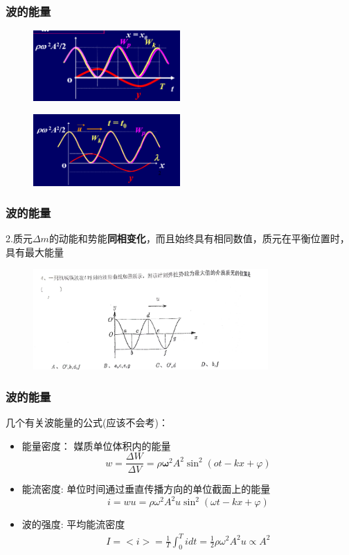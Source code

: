 \documentclass[UTF8]{ctexbeamer}
\begin{document}
\begin{frame}
\frametitle{波的能量}
\begin{figure}[!ht]
	\centering
	\includegraphics[width=0.5\textwidth]{2}
\end{figure}
\begin{figure}[!ht]
	\centering
	\includegraphics[width=0.5\textwidth]{3}
\end{figure}

\end{frame}
\begin{frame}
	\frametitle{波的能量}
2.质元$\Delta m$的动能和势能\textbf{同相变化}，而且始终具有相同数值，质元在平衡位置时，具有最大能量
\begin{examples}
	\begin{figure}[!ht]
		\centering
		\includegraphics[width=0.8\textwidth]{4}
	\end{figure}
\end{examples}
\end{frame}
\begin{frame}
	\frametitle{波的能量}
几个有关波能量的公式(应该不会考)：\\
\begin{itemize}
	\item 能量密度： 媒质单位体积内的能量
	$$w=\frac{\Delta W}{\Delta V}=\rho\boldsymbol{\omega}^2A^2\sin^2(ot-kx+\varphi)$$
	\item 能流密度: 单位时间通过垂直传播方向的单位截面上的能量
	$$i=wu=\rho\omega^2A^2u\sin^2(\omega t-kx+\varphi)$$
	\item 波的强度: 平均能流密度
	$$\begin{aligned}I=<i>=\frac1T\int_0^Tidt=\frac12\rho\omega^2A^2u \propto A^2\end{aligned}$$
\end{itemize}
\end{frame}
\end{document}
